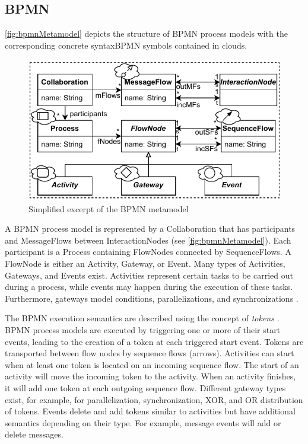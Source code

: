 \documentclass[runningheads]{llncs}
\begin{document}
\subsection{BPMN}
\autoref{fig:bpmnMetamodel} depicts the structure of BPMN process models with the corresponding concrete syntaxBPMN symbols contained in clouds.

\begin{figure}[ht]
  \centering
  \includegraphics[width=0.75\linewidth]{images/bpmn_semantics-bpmn-metamodel.pdf}
  \caption{Simplified excerpt of the BPMN metamodel \cite{objectmanagementgroupBusinessProcessModel2013}}
  \label{fig:bpmnMetamodel}
\end{figure}

A BPMN process model is represented by a \textsf{Collaboration} that has \textsf{participants} and \textsf{MessageFlows} between \textsf{InteractionNodes} (see  \autoref{fig:bpmnMetamodel}).
Each participant is a \textsf{Process} containing \textsf{FlowNodes} connected by \textsf{SequenceFlows}.
A \textsf{FlowNode} is either an \textsf{Activity}, \textsf{Gateway}, or \textsf{Event}.
Many types of \textsf{Activities}, \textsf{Gateways}, and \textsf{Events} exist.
Activities represent certain tasks to be carried out during a process, while events may happen during the execution of these tasks.
Furthermore, gateways model conditions, parallelizations, and synchronizations \cite{freundRealLifeBPMNUsing2019}.

The BPMN execution semantics are described using the concept of \emph{tokens} \cite{objectmanagementgroupBusinessProcessModel2013}.
BPMN process models are executed by triggering one or more of their start events, leading to the creation of a token at each triggered start event.
Tokens are transported between flow nodes by sequence flows (arrows).
Activities can start when at least one token is located on an incoming sequence flow.
The start of an activity will move the incoming token to the activity.
When an activity finishes, it will add one token at each outgoing sequence flow.
Different gateway types exist, for example, for parallelization, synchronization, XOR, and OR distribution of tokens.
Events delete and add tokens similar to activities but have additional semantics depending on their type.
For example, message events will add or delete messages.
\end{document}
